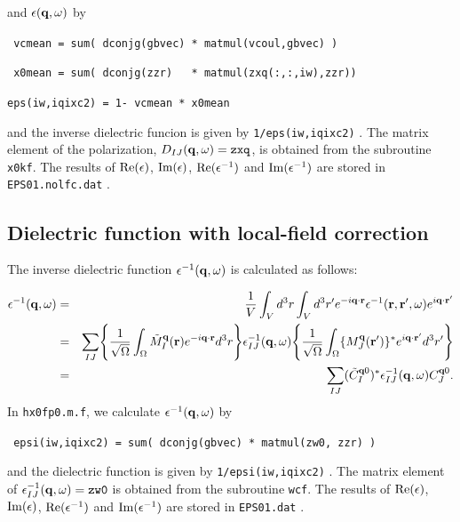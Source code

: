 \documentclass[a4paper,10pt,epsf,fleqn]{article}
\begin{document}
and $\epsilon({\bf q},\omega)$ by
\begin{center}
    \verb| vcmean = sum( dconjg(gbvec) * matmul(vcoul,gbvec) )   |
    
    \verb| x0mean = sum( dconjg(zzr)   * matmul(zxq(:,:,iw),zzr))|
    
    \verb|eps(iw,iqixc2) = 1- vcmean * x0mean|
\end{center}
and the inverse dielectric funcion is given by
\verb|1/eps(iw,iqixc2)| .  
The matrix element of the polarization, $D_{IJ}({\bf q},\omega)=\verb|zxq|$,
is obtained from the subroutine \verb|x0kf|.
The results of ${\rm Re}(\epsilon)$, ${\rm Im}(\epsilon)$, 
${\rm Re}(\epsilon^{-1})$
and ${\rm Im}(\epsilon^{-1})$ are stored in \verb|EPS01.nolfc.dat| .


\subsection{Dielectric function with local-field correction}

The inverse dielectric function $\epsilon^{-1}({\bf q},\omega)$ 
is calculated as follows:

\begin{eqnarray}
  \epsilon^{-1}({\bf q},\omega) 
 &=& \frac{1}{V}
  \int_V d^3r \int_V d^3r' e^{-i{\bf q}\cdot{\bf r}}
  \epsilon^{-1}({\bf r},{\bf r}',\omega)e^{i{\bf q}\cdot{\bf r}'} \nonumber \\
 &=&
  \sum_{IJ}
  \Biggr\{ \frac{1}{\sqrt{\Omega}} \int_{\Omega}  
  \tilde{M}_I^{\bf q}({\bf r})e^{-i{\bf q}\cdot{\bf r}}d^3r \Biggr\} 
  \epsilon_{IJ}^{-1}({\bf q}, \omega) 
  \Biggr\{ \frac{1}{\sqrt{\Omega}} \int_{\Omega}  
  \{ M_J^{\bf q}({\bf r}') \}^* e^{i{\bf q}\cdot{\bf r}'} d^3r' \Biggr\} 
  \nonumber \\
 &=& 
   \sum_{IJ} ( \tilde{C}^{{\bf q}0}_I )^* 
   \epsilon_{IJ}^{-1}({\bf q},\omega) C^{{\bf q}0}_J.
           \label{eq. epsi}
\end{eqnarray}
In \verb|hx0fp0.m.f|, we calculate $\epsilon^{-1}({\bf q},\omega)$ by
\begin{center}
 \verb| epsi(iw,iqixc2) = sum( dconjg(gbvec) * matmul(zw0, zzr) ) |
\end{center}
and the dielectric function is given by \verb|1/epsi(iw,iqixc2)| .
The matrix element of $\epsilon^{-1}_{IJ}({\bf q},\omega)=\verb|zw0|$
is obtained from the subroutine \verb|wcf|.
The results of ${\rm Re}(\epsilon)$, ${\rm Im}(\epsilon)$, 
${\rm Re}(\epsilon^{-1})$
and ${\rm Im}(\epsilon^{-1})$ are stored in \verb|EPS01.dat| .


\newpage 
\printindex



\end{document}
